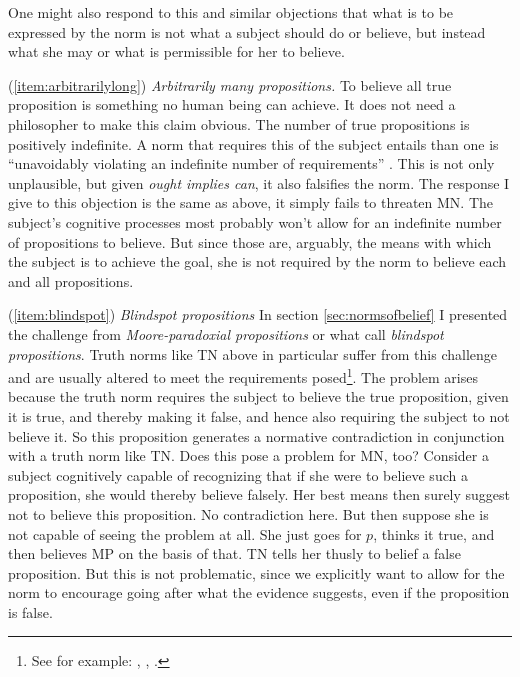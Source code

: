\documentclass[12pt,numbers=noenddot]{scrartcl}
\begin{document}
One might also respond to this and similar objections that what is to be expressed by the norm is not what a subject should do or believe, but instead what she may or what is permissible for her to believe.

(\ref{item:arbitrarilylong}) \emph{Arbitrarily many propositions.}
To believe all true proposition is something no human being can achieve. It does not need a philosopher to make this claim obvious. The number of true propositions is positively indefinite. A norm that requires this of the subject entails than one is “unavoidably violating an indefinite number of requirements” \autocite[12]{Mchugh2012-MCHTTN}. This is not only unplausible, but given \emph{ought implies can}, it also falsifies the norm. The response I give to this objection is the same as above, it simply fails to threaten MN. The subject's cognitive processes most probably won't allow for an indefinite number of propositions to believe. But since those are, arguably, the means with which the subject is to achieve the goal, she is not required by the norm to believe each and all propositions.

(\ref{item:blindspot}) \emph{Blindspot propositions}
In section \ref{sec:normsofbelief} I presented the challenge from \emph{Moore-paradoxial propositions} or what \textcite[281]{Bykvist2007-BYKDTI} call \emph{blindspot propositions}. Truth norms like TN above in particular suffer from this challenge and are usually altered to meet the requirements posed\footnote{See for example: \textcite[282]{Bykvist2007-BYKDTI}, \textcite[12]{Mchugh2012-MCHTTN}, \textcite[6]{Greenberg2016-GREITN}.}. The problem arises because the truth norm requires the subject to believe the true proposition, given it is true, and thereby making it false, and hence also requiring the subject to not believe it. So this proposition generates a normative contradiction in conjunction with a truth norm like TN. Does this pose a problem for MN, too? Consider a subject cognitively capable of recognizing that if she were to believe such a proposition, she would thereby believe falsely. Her best means then surely suggest not to believe this proposition. No contradiction here. But then suppose she is not capable of seeing the problem at all. She just goes for $p$, thinks it true, and then believes MP on the basis of that. TN tells her thusly to belief a false proposition. But this is not problematic, since we explicitly want to allow for the norm to encourage going after what the evidence suggests, even if the proposition is false.
\end{document}
